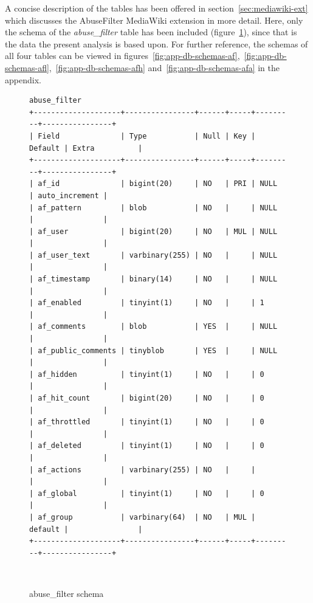 A concise description of the tables has been offered in section~\ref{sec:mediawiki-ext} which discusses the AbuseFilter MediaWiki extension in more detail.
Here, only the schema of the \emph{abuse\_filter} table has been included (figure~\ref{fig:db-schemas-af}), since that is the data the present analysis is based upon.
For further reference, the schemas of all four tables can be viewed in figures~\ref{fig:app-db-schemas-af},~\ref{fig:app-db-schemas-afl},~\ref{fig:app-db-schemas-afh} and~\ref{fig:app-db-schemas-afa} in the appendix.

\begin{figure}
\begin{verbatim}
abuse_filter
+--------------------+----------------+------+-----+---------+----------------+
| Field              | Type           | Null | Key | Default | Extra          |
+--------------------+----------------+------+-----+---------+----------------+
| af_id              | bigint(20)     | NO   | PRI | NULL    | auto_increment |
| af_pattern         | blob           | NO   |     | NULL    |                |
| af_user            | bigint(20)     | NO   | MUL | NULL    |                |
| af_user_text       | varbinary(255) | NO   |     | NULL    |                |
| af_timestamp       | binary(14)     | NO   |     | NULL    |                |
| af_enabled         | tinyint(1)     | NO   |     | 1       |                |
| af_comments        | blob           | YES  |     | NULL    |                |
| af_public_comments | tinyblob       | YES  |     | NULL    |                |
| af_hidden          | tinyint(1)     | NO   |     | 0       |                |
| af_hit_count       | bigint(20)     | NO   |     | 0       |                |
| af_throttled       | tinyint(1)     | NO   |     | 0       |                |
| af_deleted         | tinyint(1)     | NO   |     | 0       |                |
| af_actions         | varbinary(255) | NO   |     |         |                |
| af_global          | tinyint(1)     | NO   |     | 0       |                |
| af_group           | varbinary(64)  | NO   | MUL | default |                |
+--------------------+----------------+------+-----+---------+----------------+
\end{verbatim}
  \caption{abuse\_filter schema}~\label{fig:db-schemas-af}
\end{figure}

